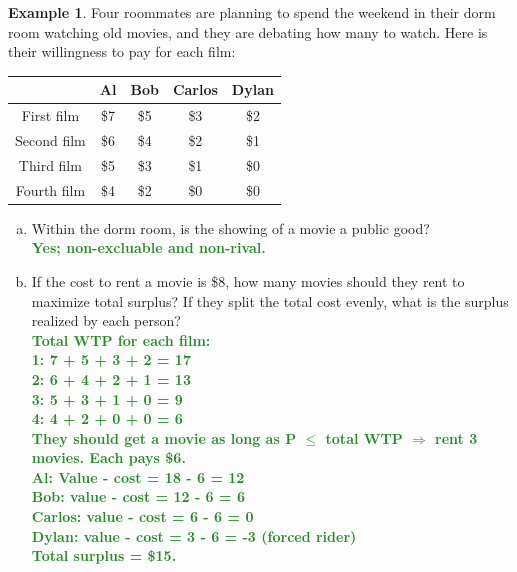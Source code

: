 \documentclass[11pt]{article}\usepackage[]{graphicx}\usepackage[]{color}
\theoremstyle{definition}
\newtheorem{exmp}{Example}[section]
\newcommand{\ddp}[1]{{\textbf{\textcolor{ForestGreen}{#1}}}}
\begin{document}
	
	\begin{exmp} Four roommates are planning to spend the weekend in their dorm room watching old movies, and they are debating how many to watch. Here is their willingness to pay for each film:
	
	
	\begin{table}[ht]
		\centering
		\begin{tabular}{ c|c|c|c|c }        
			
			& Al & Bob & Carlos & Dylan \\
			\hline
			First film & \$7 & \$5 & \$3 & \$2 \\
			Second film & \$6 & \$4 & \$2 & \$1 \\
			Third film & \$5 & \$3 & \$1 & \$0 \\
			Fourth film & \$4 & \$2 & \$0 & \$0 \\
		\end{tabular}
	\end{table} 
	
	\begin{enumerate}[a.]
		\item Within the dorm room, is the showing of a movie a public good?
		\ddp{\\ Yes; non-excluable and non-rival.}
		\item If the cost to rent a movie is \$8, how many movies should they rent to maximize total surplus? If they split the total cost evenly, what is the surplus realized by each person?
		\ddp{\\ Total WTP for each film: \\
			1: 7 + 5 + 3 + 2 = 17 \\
			2: 6 + 4 + 2 + 1 = 13 \\
			3: 5 + 3 + 1 + 0 = 9 \\
			4: 4 + 2 + 0 + 0 = 6 \\
			They should get a movie as long as P $\le$ total WTP $\Rightarrow$ rent 3 movies. Each pays \$6. \\
			Al: Value - cost = 18 - 6 = 12 \\
			Bob: value - cost = 12 - 6 = 6 \\
			Carlos: value - cost = 6 - 6 = 0 \\
			Dylan: value - cost = 3 - 6 = -3 (forced rider) \\
			Total surplus = \$15.}
	\end{enumerate}
	\end{exmp}
	
\newpage	
	
\end{document}
